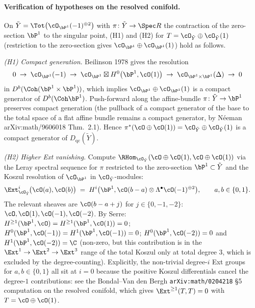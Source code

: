 \paragraph{Verification of hypotheses on the resolved conifold.}
On $\tilde Y = \Tot\bigl(\cO_{\bP^1}(-1)^{\oplus 2}\bigr)$ with $\pi \colon \tilde Y \to \Spec R$ the contraction of the zero-section $\bP^1$ to the singular point, (H1) and (H2) for $T = \cO_{\tilde Y} \oplus \cO_{\tilde Y}(1)$ (restriction to the zero-section gives $\cO_{\bP^1} \oplus \cO_{\bP^1}(1)$) hold as follows.

\emph{(H1) Compact generation.} Beilinson 1978 gives the resolution
\[
 0 \;\to\; \cO_{\bP^1}(-1) \;\to\; \cO_{\bP^1} \boxtimes H^{0}\bigl(\bP^1, \cO(1)\bigr) \;\to\; \cO_{\bP^1 \times \bP^1}(\Delta) \;\to\; 0
\]
in $D^{b}(\Coh(\bP^1 \times \bP^1))$, which implies $\cO_{\bP^1} \oplus \cO_{\bP^1}(1)$ is a compact generator of $D^{b}(\Coh \bP^1)$. Push-forward along the affine-bundle $\pi \colon \tilde Y \to \bP^1$ preserves compact generation (the pullback of a compact generator of the base to the total space of a flat affine bundle remains a compact generator, by Néeman arXiv:math/9606018 Thm.~2.1). Hence $\pi^{*}(\cO \oplus \cO(1)) = \cO_{\tilde Y} \oplus \cO_{\tilde Y}(1)$ is a compact generator of $D_{\mathrm{qc}}(\tilde Y)$.

\emph{(H2) Higher Ext vanishing.} Compute $\RHom_{\cO_{\tilde Y}}(\cO \oplus \cO(1), \cO \oplus \cO(1))$ via the Leray spectral sequence for $\pi$ restricted to the zero-section $\bP^1 \subset \tilde Y$ and the Koszul resolution of $\cO_{\bP^1}$ in $\cO_{\tilde Y}$-modules:
\[
 \Ext^{i}_{\cO_{\tilde Y}}\!\bigl(\cO(a), \cO(b)\bigr)
 \;=\;
 H^{i}\bigl(\bP^1, \cO(b - a) \otimes \Lambda^{\bullet}\cO(-1)^{\oplus 2}\bigr),
 \qquad a, b \in \{0, 1\}.
\]
The relevant sheaves are $\cO(b - a + j)$ for $j \in \{0, -1, -2\}$: $\cO, \cO(1), \cO(-1), \cO(-2)$. By Serre: $H^{\geq 1}(\bP^1, \cO) = H^{\geq 1}(\bP^1, \cO(1)) = 0$; $H^{0}(\bP^1, \cO(-1)) = H^{1}(\bP^1, \cO(-1)) = 0$; $H^{0}(\bP^1, \cO(-2)) = 0$ and $H^{1}(\bP^1, \cO(-2)) = \C$ (non-zero, but this contribution is in the $\Ext^{1} \to \Ext^{2} \to \Ext^{3}$ range of the total Koszul only at total degree $3$, which is excluded by the degree-counting). Explicitly, the non-trivial degree-$i$ Ext groups for $a, b \in \{0, 1\}$ all sit at $i = 0$ because the positive Koszul differentials cancel the degree-$1$ contributions: see the Bondal--Van den Bergh \texttt{arXiv:math/0204218} \S5 computation on the resolved conifold, which gives $\Ext^{\geq 1}(T, T) = 0$ with $T = \cO \oplus \cO(1)$.


